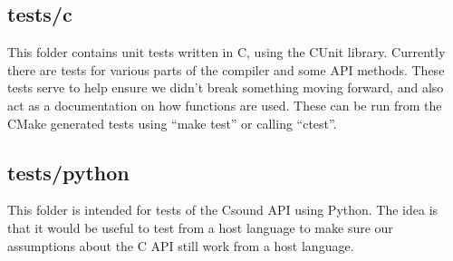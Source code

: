 \documentclass[]{book}
\begin{document}
\subsection{tests/c}

This folder contains unit tests written in C, using the CUnit library.
Currently there are tests for various parts of the compiler and some API
methods. These tests serve to help ensure we didn't break something
moving forward, and also act as a documentation on how functions are
used. These can be run from the CMake generated tests using ``make
test'' or calling ``ctest''.

\subsection{tests/python}

This folder is intended for tests of the Csound API using Python. The
idea is that it would be useful to test from a host language to make
sure our assumptions about the C API still work from a host language.
\end{document}
